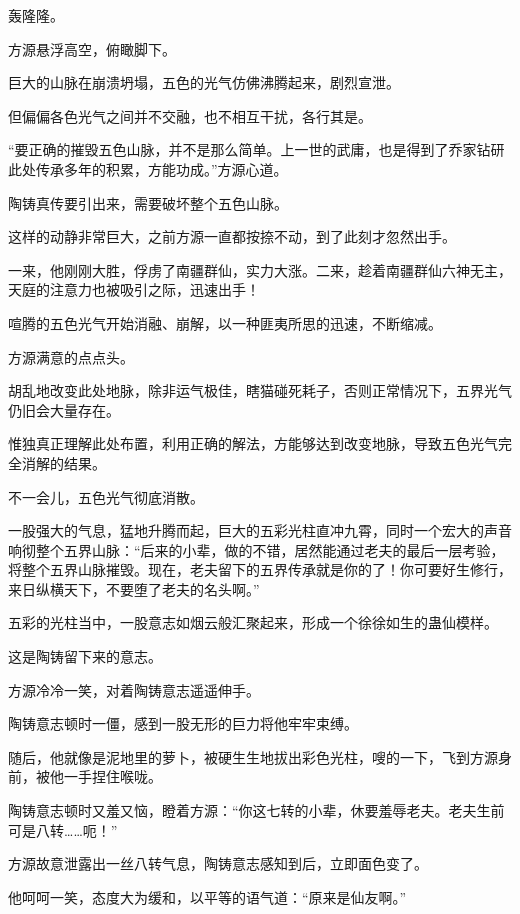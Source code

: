 
\begin{this_body}

轰隆隆。

方源悬浮高空，俯瞰脚下。

巨大的山脉在崩溃坍塌，五色的光气仿佛沸腾起来，剧烈宣泄。

但偏偏各色光气之间并不交融，也不相互干扰，各行其是。

“要正确的摧毁五色山脉，并不是那么简单。上一世的武庸，也是得到了乔家钻研此处传承多年的积累，方能功成。”方源心道。

陶铸真传要引出来，需要破坏整个五色山脉。

这样的动静非常巨大，之前方源一直都按捺不动，到了此刻才忽然出手。

一来，他刚刚大胜，俘虏了南疆群仙，实力大涨。二来，趁着南疆群仙六神无主，天庭的注意力也被吸引之际，迅速出手！

喧腾的五色光气开始消融、崩解，以一种匪夷所思的迅速，不断缩减。

方源满意的点点头。

胡乱地改变此处地脉，除非运气极佳，瞎猫碰死耗子，否则正常情况下，五界光气仍旧会大量存在。

惟独真正理解此处布置，利用正确的解法，方能够达到改变地脉，导致五色光气完全消解的结果。

不一会儿，五色光气彻底消散。

一股强大的气息，猛地升腾而起，巨大的五彩光柱直冲九霄，同时一个宏大的声音响彻整个五界山脉：“后来的小辈，做的不错，居然能通过老夫的最后一层考验，将整个五界山脉摧毁。现在，老夫留下的五界传承就是你的了！你可要好生修行，来日纵横天下，不要堕了老夫的名头啊。”

五彩的光柱当中，一股意志如烟云般汇聚起来，形成一个徐徐如生的蛊仙模样。

这是陶铸留下来的意志。

方源冷冷一笑，对着陶铸意志遥遥伸手。

陶铸意志顿时一僵，感到一股无形的巨力将他牢牢束缚。

随后，他就像是泥地里的萝卜，被硬生生地拔出彩色光柱，嗖的一下，飞到方源身前，被他一手捏住喉咙。

陶铸意志顿时又羞又恼，瞪着方源：“你这七转的小辈，休要羞辱老夫。老夫生前可是八转……呃！”

方源故意泄露出一丝八转气息，陶铸意志感知到后，立即面色变了。

他呵呵一笑，态度大为缓和，以平等的语气道：“原来是仙友啊。”


\end{this_body}
